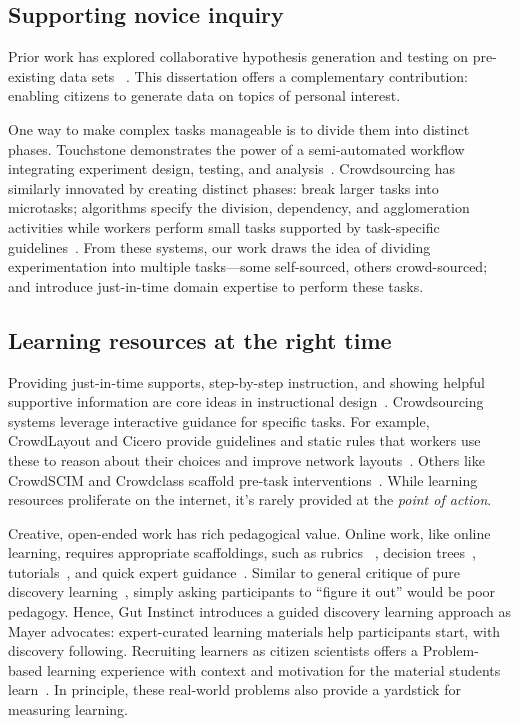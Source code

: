 \subsection{Supporting novice inquiry}
Prior work has explored  collaborative hypothesis generation and testing on pre-existing data sets
~\cite{luther2009pathfinder,willett2011commentspace}. This dissertation offers a 
complementary contribution: enabling citizens to generate data on topics of personal interest.

One way to make complex tasks manageable is to divide them into distinct phases. 
Touchstone demonstrates the power of a semi-automated workflow integrating experiment 
design, testing, and analysis~\cite{Mackay2007}. Crowdsourcing has similarly innovated by 
creating distinct phases: break larger tasks into microtasks; algorithms specify the division, 
dependency, and agglomeration activities while workers perform small tasks supported by 
task-specific guidelines~\cite{lasecki2012real}. From these systems, our work draws the 
idea of dividing experimentation into multiple tasks—some self-sourced, others 
crowd-sourced; and introduce just-in-time domain expertise to perform these tasks. 


\subsection{Learning resources at the right time}
Providing just-in-time supports, step-by-step instruction, and showing helpful supportive
 information are core ideas in instructional design~\cite{Kirschner2008}. Crowdsourcing 
systems leverage interactive guidance for specific tasks. For example, CrowdLayout and 
Cicero provide guidelines and static rules that workers use these to reason about their choices
 and improve network layouts~\cite{chen2019cicero, Singh:2018:CCD:3173574.3173806}. 
Others like CrowdSCIM and Crowdclass scaffold pre-task interventions~\cite{Lee2016,wang2018exploring}. 
While learning resources proliferate on the internet, it's rarely provided at the \textit{point of action}. 

Creative, open-ended work has rich pedagogical value. Online work, like 
online learning, requires appropriate scaffoldings, such as rubrics
~\cite{Boud1995, Kulkarni2013peer}, decision trees~\cite{Lee2016,Yu2006}, 
tutorials~\cite{Andersen2012}, and quick expert guidance~\cite{dow2012shepherding}. 
Similar to general critique of pure discovery learning~\cite{Mayer2004}, simply 
asking participants to “figure it out” would be poor pedagogy. Hence, Gut Instinct 
introduces a guided discovery learning approach as Mayer advocates: expert-curated 
learning materials help participants start, with discovery following. Recruiting learners
 as citizen scientists offers a Problem-based learning experience with context and 
motivation for the material students learn~\cite{Savery1995}. In principle, these 
real-world problems also provide a yardstick for measuring learning. 

